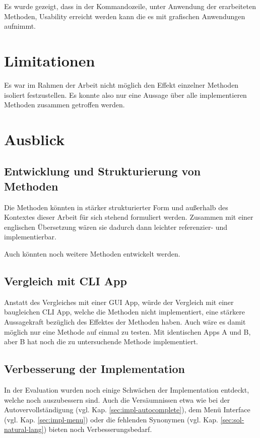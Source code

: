 \documentclass[oneside,bibliography=totocnumbered,BCOR=5mm]{scrbook}
\begin{document}
Es wurde gezeigt, dass in der Kommandozeile, unter Anwendung der erarbeiteten
Methoden, Usability erreicht werden kann die es mit grafischen Anwendungen
aufnimmt.

\section{Limitationen}

Es war im Rahmen der Arbeit nicht möglich den Effekt einzelner Methoden isoliert
festzustellen. Es konnte also nur eine Aussage über alle implementieren Methoden
zusammen getroffen werden.

\section{Ausblick}
\subsection{Entwicklung und Strukturierung von Methoden}

Die Methoden könnten in stärker strukturierter Form und außerhalb des Kontextes
dieser Arbeit für sich stehend formuliert werden. Zusammen mit einer englischen
Übersetzung wären sie dadurch dann leichter referenzier- und implementierbar.

Auch könnten noch weitere Methoden entwickelt werden.

\subsection{Vergleich mit CLI App}

Anstatt des Vergleiches mit einer GUI App, würde der Vergleich mit einer
baugleichen CLI App, welche die Methoden nicht implementiert, eine stärkere
Aussagekraft bezüglich des Effektes der Methoden haben. Auch wäre es damit
möglich nur eine Methode auf einmal zu testen. Mit identischen Apps A und B,
aber B hat noch die zu untersuchende Methode implementiert.

\subsection{Verbesserung der Implementation}

In der Evaluation wurden noch einige Schwächen der Implementation entdeckt,
welche noch auszubessern sind. Auch die Versäumnissen etwa wie bei der
Autovervollständigung (vgl. Kap. \ref{sec:impl-autocomplete}), dem Menü
Interface (vgl. Kap. \ref{sec:impl-menu}) oder die fehlenden Synonymen (vgl.
Kap. \ref{sec:sol-natural-lang}) bieten noch Verbesserungsbedarf.
\end{document}
